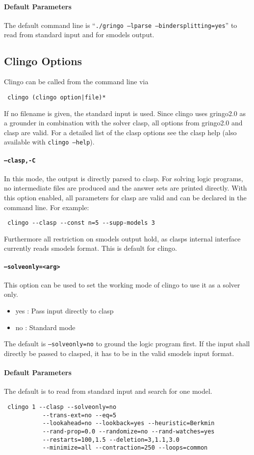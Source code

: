 \documentclass[a4paper,10pt]{article}
\begin{document}
\paragraph{Default Parameters}
The default command line is ``\texttt{./gringo --lparse --bindersplitting=yes}'' to read from standard input and for smodels output.

\subsection{Clingo Options}

Clingo can be called from the command line via
\begin{verbatim}
 clingo (clingo option|file)*
\end{verbatim}
If no filename is given, the standard input is used.
Since clingo uses gringo2.0 as a grounder in combination with the solver clasp, all options from gringo2.0 and clasp are valid. For a detailed list of the clasp options see the clasp help (also available with \texttt{clingo --help}).
\paragraph{\texttt{--clasp,-C}}
In this mode, the output is directly parsed to clasp. For solving logic programs, no intermediate files are produced and the answer sets are printed directly.
With this option enabled, all parameters for clasp are valid and can be declared in the command line.
For example:
\begin{verbatim}
 clingo --clasp --const n=5 --supp-models 3
\end{verbatim}
Furthermore all restriction on smodels output hold, as clasps internal interface currently reads smodels format.
This is default for clingo.
\paragraph{\texttt{--solveonly=<arg>}}
This option can be used to set the working mode of clingo to use it as a solver only.
\begin{itemize}
\item yes : Pass input directly to clasp
\item no : Standard mode
\end{itemize}
The default is \texttt{--solveonly=no} to ground the logic program first.
If the input shall directly be passed to clasped, it has to be in the valid smodels input format.

\paragraph{Default Parameters}
The default is to read from standard input and search for one model.
\begin{verbatim}
 clingo 1 --clasp --solveonly=no
           --trans-ext=no --eq=5 
           --lookahead=no --lookback=yes --heuristic=Berkmin
           --rand-prop=0.0 --randomize=no --rand-watches=yes
           --restarts=100,1.5 --deletion=3,1.1,3.0
           --minimize=all --contraction=250 --loops=common
\end{verbatim}
\end{document}
